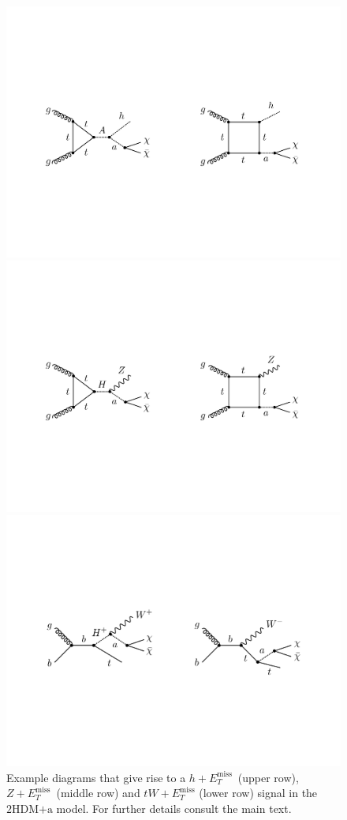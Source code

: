 \documentclass[a4paper, 11pt,notoc]{article}
\newcommand{\MET}{\ensuremath{E_T^\mathrm{miss}}\xspace}
\newcommand{\hdma}{\ensuremath{\textrm{2HDM+a}}\xspace}
\begin{document}
\begin{figure}[t!]
\centering
\includegraphics[width=.8\textwidth]{hmet.pdf}

\vspace{4mm}

\includegraphics[width=.8\textwidth]{zmet.pdf}

\vspace{5mm}

\includegraphics[width=.8\textwidth]{twmet.pdf}

\vspace{4mm}
\caption{\label{fig:resonant} Example diagrams that give rise to a $h+\MET$~(upper row), $Z+\MET$~(middle row) and $tW + \MET$ (lower row) signal in the \hdma model. For further details consult the main text. }
\end{figure}
\end{document}
